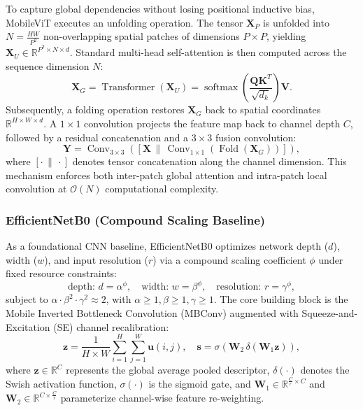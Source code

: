 \documentclass[journal]{IEEEtran}
\begin{document}
To capture global dependencies without losing positional inductive bias, MobileViT executes an unfolding operation. The tensor $\mathbf{X}_P$ is unfolded into $N = \frac{HW}{P^2}$ non-overlapping spatial patches of dimensions $P \times P$, yielding $\mathbf{X}_U \in \mathbb{R}^{P^2 \times N \times d}$. Standard multi-head self-attention is then computed across the sequence dimension $N$:
\begin{equation}
\mathbf{X}_G = \operatorname{Transformer}\left(\mathbf{X}_U\right) = \operatorname{softmax}\left(\frac{\mathbf{Q}\mathbf{K}^T}{\sqrt{d_k}}\right)\mathbf{V}.
\label{eq:mobilevit_attn}
\end{equation}
Subsequently, a folding operation restores $\mathbf{X}_G$ back to spatial coordinates $\mathbb{R}^{H \times W \times d}$. A $1\times1$ convolution projects the feature map back to channel depth $C$, followed by a residual concatenation and a $3\times3$ fusion convolution:
\begin{equation}
\mathbf{Y} = \operatorname{Conv}_{3\times3}\left(\left[\mathbf{X} \,\|\, \operatorname{Conv}_{1\times1}\left(\operatorname{Fold}\left(\mathbf{X}_G\right)\right)\right]\right),
\label{eq:mobilevit_fusion}
\end{equation}
where $[\cdot \,\|\, \cdot]$ denotes tensor concatenation along the channel dimension. This mechanism enforces both inter-patch global attention and intra-patch local convolution at $\mathcal{O}(N)$ computational complexity.

\subsubsection{EfficientNetB0 (Compound Scaling Baseline)}
As a foundational CNN baseline, EfficientNetB0 optimizes network depth ($d$), width ($w$), and input resolution ($r$) via a compound scaling coefficient $\phi$ under fixed resource constraints:
\begin{equation}
\text{depth: } d = \alpha^\phi, \quad \text{width: } w = \beta^\phi, \quad \text{resolution: } r = \gamma^\phi,
\label{eq:efficientnet_scaling}
\end{equation}
subject to $\alpha \cdot \beta^2 \cdot \gamma^2 \approx 2$, with $\alpha \ge 1, \beta \ge 1, \gamma \ge 1$. The core building block is the Mobile Inverted Bottleneck Convolution (MBConv) augmented with Squeeze-and-Excitation (SE) channel recalibration:
\begin{equation}
\mathbf{z} = \frac{1}{H \times W} \sum_{i=1}^H \sum_{j=1}^W \mathbf{u}(i,j), \quad \mathbf{s} = \sigma\left(\mathbf{W}_2 \, \delta\left(\mathbf{W}_1 \mathbf{z}\right)\right),
\label{eq:se_block}
\end{equation}
where $\mathbf{z} \in \mathbb{R}^C$ represents the global average pooled descriptor, $\delta(\cdot)$ denotes the Swish activation function, $\sigma(\cdot)$ is the sigmoid gate, and $\mathbf{W}_1 \in \mathbb{R}^{\frac{C}{r} \times C}$ and $\mathbf{W}_2 \in \mathbb{R}^{C \times \frac{C}{r}}$ parameterize channel-wise feature re-weighting.
\end{document}

